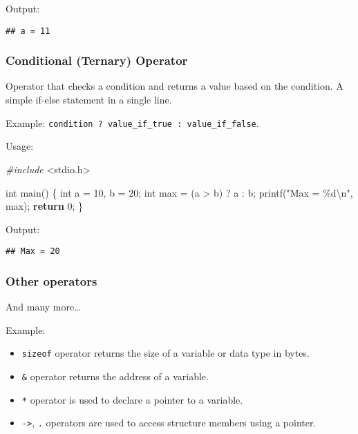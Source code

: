 \documentclass[
]{article}
\newenvironment{Shaded}{\begin{snugshade}}{\end{snugshade}}
\newcommand{\ControlFlowTok}[1]{\textcolor[rgb]{0.13,0.29,0.53}{\textbf{#1}}}
\newcommand{\DataTypeTok}[1]{\textcolor[rgb]{0.13,0.29,0.53}{#1}}
\newcommand{\DecValTok}[1]{\textcolor[rgb]{0.00,0.00,0.81}{#1}}
\newcommand{\ImportTok}[1]{#1}
\newcommand{\NormalTok}[1]{#1}
\newcommand{\PreprocessorTok}[1]{\textcolor[rgb]{0.56,0.35,0.01}{\textit{#1}}}
\newcommand{\SpecialCharTok}[1]{\textcolor[rgb]{0.00,0.00,0.00}{#1}}
\newcommand{\StringTok}[1]{\textcolor[rgb]{0.31,0.60,0.02}{#1}}
\providecommand{\tightlist}{%
  \setlength{\itemsep}{0pt}\setlength{\parskip}{0pt}}
\begin{document}
Output:

\begin{verbatim}
## a = 11
\end{verbatim}

\hypertarget{conditional-ternary-operator}{%
\subsubsection{Conditional (Ternary)
Operator}\label{conditional-ternary-operator}}

Operator that checks a condition and returns a value based on the
condition. A simple if-else statement in a single line.

Example: \texttt{condition\ ?\ value\_if\_true\ :\ value\_if\_false}.

Usage:

\begin{Shaded}
\begin{Highlighting}[]
\PreprocessorTok{\#include }\ImportTok{\textless{}stdio.h\textgreater{}}

\DataTypeTok{int}\NormalTok{ main() \{}
    \DataTypeTok{int}\NormalTok{ a = }\DecValTok{10}\NormalTok{, b = }\DecValTok{20}\NormalTok{;}
    \DataTypeTok{int}\NormalTok{ max = (a \textgreater{} b) ? a : b;}
\NormalTok{    printf(}\StringTok{"Max = \%d}\SpecialCharTok{\textbackslash{}n}\StringTok{"}\NormalTok{, max);}
    \ControlFlowTok{return} \DecValTok{0}\NormalTok{;}
\NormalTok{\}}
\end{Highlighting}
\end{Shaded}

Output:

\begin{verbatim}
## Max = 20
\end{verbatim}

\hypertarget{other-operators}{%
\subsubsection{Other operators}\label{other-operators}}

And many more\ldots{}

Example:

\begin{itemize}
\tightlist
\item
  \texttt{sizeof} operator returns the size of a variable or data type
  in bytes.
\item
  \texttt{\&} operator returns the address of a variable.
\item
  \texttt{*} operator is used to declare a pointer to a variable.
\item
  \texttt{-\textgreater{}}, \texttt{.} operators are used to access
  structure members using a pointer.
\end{itemize}
\end{document}
